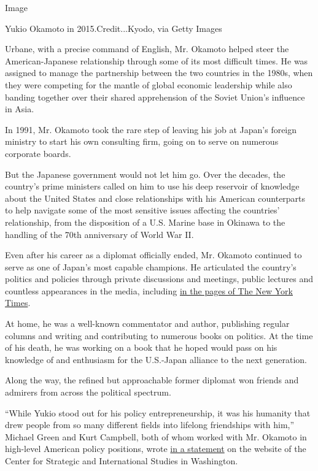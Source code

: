 Image

Yukio Okamoto in 2015.Credit...Kyodo, via Getty Images

Urbane, with a precise command of English, Mr. Okamoto helped steer the
American-Japanese relationship through some of its most difficult times.
He was assigned to manage the partnership between the two countries in
the 1980s, when they were competing for the mantle of global economic
leadership while also banding together over their shared apprehension of
the Soviet Union's influence in Asia.

In 1991, Mr. Okamoto took the rare step of leaving his job at Japan's
foreign ministry to start his own consulting firm, going on to serve on
numerous corporate boards.

But the Japanese government would not let him go. Over the decades, the
country's prime ministers called on him to use his deep reservoir of
knowledge about the United States and close relationships with his
American counterparts to help navigate some of the most sensitive issues
affecting the countries' relationship, from the disposition of a U.S.
Marine base in Okinawa to the handling of the 70th anniversary of World
War II.

Even after his career as a diplomat officially ended, Mr. Okamoto
continued to serve as one of Japan's most capable champions. He
articulated the country's politics and policies through private
discussions and meetings, public lectures and countless appearances in
the media, including
\href{https://www.nytimes.com/1991/03/17/weekinreview/the-world-the-view-from-inside-a-strained-relationship.html}{in
the pages of The New York Times}.

At home, he was a well-known commentator and author, publishing regular
columns and writing and contributing to numerous books on politics. At
the time of his death, he was working on a book that he hoped would pass
on his knowledge of and enthusiasm for the U.S.-Japan alliance to the
next generation.

Along the way, the refined but approachable former diplomat won friends
and admirers from across the political spectrum.

``While Yukio stood out for his policy entrepreneurship, it was his
humanity that drew people from so many different fields into lifelong
friendships with him,'' Michael Green and Kurt Campbell, both of whom
worked with Mr. Okamoto in high-level American policy positions, wrote
\href{https://www.csis.org/analysis/remembering-yukio-okamoto}{in a
statement} on the website of the Center for Strategic and International
Studies in Washington.

